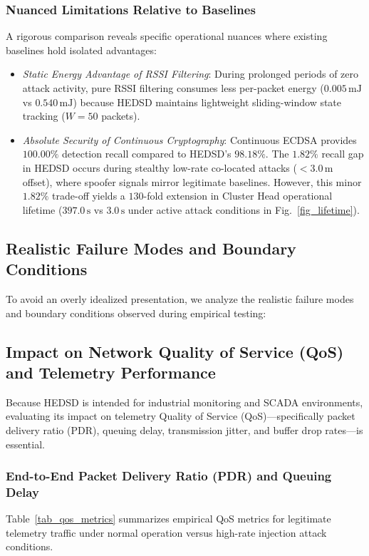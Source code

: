 \documentclass[conference]{IEEEtran}
\begin{document}
\begin{enumerate}
\subsubsection{Nuanced Limitations Relative to Baselines}
A rigorous comparison reveals specific operational nuances where existing baselines hold isolated advantages:
\begin{itemize}
    \item \textit{Static Energy Advantage of RSSI Filtering}: During prolonged periods of zero attack activity, pure RSSI filtering consumes less per-packet energy ($0.005\,\text{mJ}$ vs $0.540\,\text{mJ}$) because HEDSD maintains lightweight sliding-window state tracking ($W=50$ packets).
    \item \textit{Absolute Security of Continuous Cryptography}: Continuous ECDSA provides $100.00\%$ detection recall compared to HEDSD's $98.18\%$. The $1.82\%$ recall gap in HEDSD occurs during stealthy low-rate co-located attacks ($<3.0\,\text{m}$ offset), where spoofer signals mirror legitimate baselines. However, this minor $1.82\%$ trade-off yields a $130$-fold extension in Cluster Head operational lifetime ($397.0\,\text{s}$ vs $3.0\,\text{s}$ under active attack conditions in Fig.~\ref{fig_lifetime}).
\end{itemize}

\subsection{Realistic Failure Modes and Boundary Conditions}
To avoid an overly idealized presentation, we analyze the realistic failure modes and boundary conditions observed during empirical testing:
\subsection{Impact on Network Quality of Service (QoS) and Telemetry Performance}
\label{subsec_qos_evaluation}
Because HEDSD is intended for industrial monitoring and SCADA environments, evaluating its impact on telemetry Quality of Service (QoS)—specifically packet delivery ratio (PDR), queuing delay, transmission jitter, and buffer drop rates—is essential.

\subsubsection{End-to-End Packet Delivery Ratio (PDR) and Queuing Delay}
Table~\ref{tab_qos_metrics} summarizes empirical QoS metrics for legitimate telemetry traffic under normal operation versus high-rate injection attack conditions.


\end{enumerate}
\end{document}
